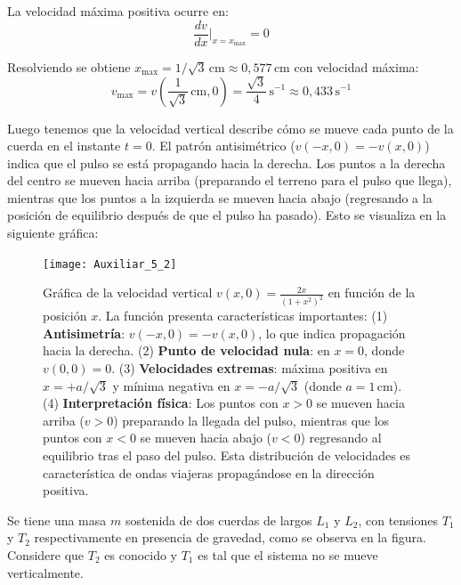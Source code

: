 \documentclass[
  11pt,
  letterpaper,
   addpoints,
  ]{exam}
\begin{document}
\begin{questions}
\begin{solution}
  La velocidad máxima positiva ocurre en:
  \begin{equation}
    \frac{dv}{dx}\bigg|_{x=x_{\max}} = 0
  \end{equation}
  
  Resolviendo se obtiene $x_{\max} = 1/\sqrt{3}\,\mathrm{cm} \approx 0{,}577\,\mathrm{cm}$ con velocidad máxima:
  \begin{equation}
    v_{\max} = v\left(\frac{1}{\sqrt{3}}\,\mathrm{cm}, 0\right) = \frac{\sqrt{3}}{4}\,\mathrm{s}^{-1} \approx 0{,}433\,\mathrm{s}^{-1}
  \end{equation}
  
  Luego tenemos que la velocidad vertical describe cómo se mueve cada punto de la cuerda en el instante $t = 0$. El patrón antisimétrico ($v(-x,0) = -v(x,0)$) indica que el pulso se está propagando hacia la derecha. Los puntos a la derecha del centro se mueven hacia arriba (preparando el terreno para el pulso que llega), mientras que los puntos a la izquierda se mueven hacia abajo (regresando a la posición de equilibrio después de que el pulso ha pasado). Esto se visualiza en la siguiente gráfica:
  
  \begin{figure}[H]
    \centering
    \texttt{[image: Auxiliar\_5\_2]}
    \caption{Gráfica de la velocidad vertical $v(x,0) = \frac{2x}{(1+x^2)^2}$ en función de la posición $x$. La función presenta características importantes: (1) \textbf{Antisimetría}: $v(-x,0) = -v(x,0)$, lo que indica propagación hacia la derecha. (2) \textbf{Punto de velocidad nula}: en $x = 0$, donde $v(0,0) = 0$. (3) \textbf{Velocidades extremas}: máxima positiva en $x = +a/\sqrt{3}$ y mínima negativa en $x = -a/\sqrt{3}$ (donde $a = 1\,\mathrm{cm}$). (4) \textbf{Interpretación física}: Los puntos con $x > 0$ se mueven hacia arriba ($v > 0$) preparando la llegada del pulso, mientras que los puntos con $x < 0$ se mueven hacia abajo ($v < 0$) regresando al equilibrio tras el paso del pulso. Esta distribución de velocidades es característica de ondas viajeras propagándose en la dirección positiva.}
  \end{figure}
\end{solution}

\question Se tiene una masa $m$ sostenida de dos cuerdas de largos $L_1$ y $L_2$, con tensiones $T_1$ y $T_2$ respectivamente en presencia de gravedad, como se observa en la figura. Considere que $T_2$ es conocido y $T_1$ es tal que el sistema no se mueve verticalmente.


\end{questions}
\end{document}
